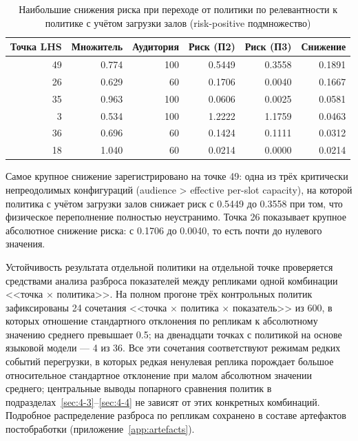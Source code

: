 \begin{table}[h!]
\caption{Наибольшие снижения риска при переходе от политики по релевантности к политике с учётом загрузки залов (risk-positive подмножество)}
\label{tab:risk-reductions}
\centering
\small
\begin{tabular}{|r|r|r|r|r|r|}
\hline
\textbf{Точка LHS} & \textbf{Множитель} & \textbf{Аудитория} & \textbf{Риск (П2)} & \textbf{Риск (П3)} & \textbf{Снижение} \\
\hline
49 & 0.774 & 100 & 0.5449 & 0.3558 & 0.1891 \\
\hline
26 & 0.629 &  60 & 0.1706 & 0.0040 & 0.1667 \\
\hline
35 & 0.963 & 100 & 0.0606 & 0.0025 & 0.0581 \\
\hline
 3 & 0.534 & 100 & 1.2222 & 1.1759 & 0.0463 \\
\hline
36 & 0.696 &  60 & 0.1424 & 0.1111 & 0.0312 \\
\hline
18 & 1.040 &  60 & 0.0214 & 0.0000 & 0.0214 \\
\hline
\end{tabular}
\end{table}

Самое крупное снижение зарегистрировано на точке 49: одна из трёх критически непреодолимых конфигураций (audience > effective per-slot capacity), на которой политика с учётом загрузки залов снижает риск с 0.5449 до 0.3558 при том, что физическое переполнение полностью неустранимо. Точка 26 показывает крупное абсолютное снижение риска: с 0.1706 до 0.0040, то есть почти до нулевого значения.

Устойчивость результата отдельной политики на отдельной точке проверяется средствами анализа разброса показателей между репликами одной комбинации <<точка $\times$ политика>>. На полном прогоне трёх контрольных политик зафиксированы 24 сочетания <<точка $\times$ политика $\times$ показатель>> из 600, в которых отношение стандартного отклонения по репликам к абсолютному значению среднего превышает 0.5; на двенадцати точках с политикой на основе языковой модели --- 4 из 36. Все эти сочетания соответствуют режимам редких событий перегрузки, в которых редкая ненулевая реплика порождает большое относительное стандартное отклонение при малом абсолютном значении среднего; центральные выводы попарного сравнения политик в подразделах~\ref{sec:4-3}--\ref{sec:4-4} не зависят от этих конкретных комбинаций. Подробное распределение разброса по репликам сохранено в составе артефактов постобработки (приложение~\ref{app:artefacts}).

